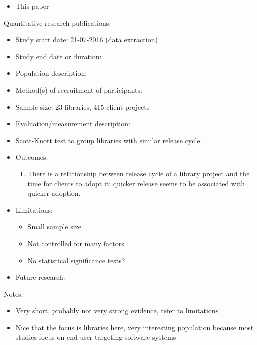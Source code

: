 \documentclass[]{book}
\providecommand{\tightlist}{%
  \setlength{\itemsep}{0pt}\setlength{\parskip}{0pt}}
\begin{document}
\begin{itemize}
\tightlist
\item
  This paper
\end{itemize}

Quantitative research publications:

\begin{itemize}
\tightlist
\item
  Study start date: 21-07-2016 (data extraction)
\item
  Study end date or duration:
\item
  Population description:
\item
  Method(s) of recruitment of participants:
\item
  Sample size: 23 libraries, 415 client projects
\item
  Evaluation/measurement description:
\item
  Scott-Knott test to group libraries with similar release cycle.
\item
  Outcomes:

  \begin{enumerate}
  \def\labelenumi{\arabic{enumi}.}
  \tightlist
  \item
    There is a relationship between release cycle of a library project
    and the time for clients to adopt it: quicker release seems to be
    associated with quicker adoption.
  \end{enumerate}
\item
  Limitations:

  \begin{itemize}
  \tightlist
  \item
    Small sample size
  \item
    Not controlled for many factors
  \item
    No statistical significance tests?
  \end{itemize}
\item
  Future research:
\end{itemize}

Notes:

\begin{itemize}
\tightlist
\item
  Very short, probably not very strong evidence, refer to limitations
\item
  Nice that the focus is libraries here, very interesting population
  because most studies focus on end-user targeting software systems
\end{itemize}
\end{document}
